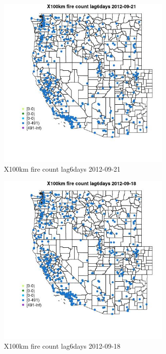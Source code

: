 \begin{figure} 
\centering  
\includegraphics[width=0.77\textwidth]{Code_Outputs/Report_ML_input_PM25_Step4_part_e_de_duplicated_aves_compiled_2019-05-14wNAs_MapObsX100km_fire_count_lag6days2012-09-21.jpg} 
\caption{\label{fig:Report_ML_input_PM25_Step4_part_e_de_duplicated_aves_compiled_2019-05-14wNAsMapObsX100km_fire_count_lag6days2012-09-21}X100km fire count lag6days 2012-09-21} 
\end{figure} 
 

\clearpage 

\begin{figure} 
\centering  
\includegraphics[width=0.77\textwidth]{Code_Outputs/Report_ML_input_PM25_Step4_part_e_de_duplicated_aves_compiled_2019-05-14wNAs_MapObsX100km_fire_count_lag6days2012-09-18.jpg} 
\caption{\label{fig:Report_ML_input_PM25_Step4_part_e_de_duplicated_aves_compiled_2019-05-14wNAsMapObsX100km_fire_count_lag6days2012-09-18}X100km fire count lag6days 2012-09-18} 
\end{figure} 
 

